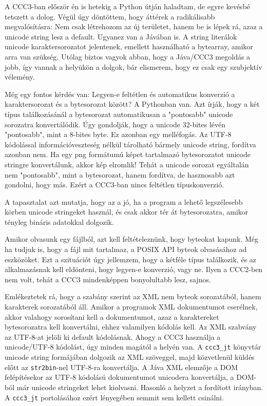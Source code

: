 A CCC3-ban először én is hetekig a Python útján haladtam,
de egyre kevésbé tetszett a dolog. Végül úgy döntöttem,
hogy áttérek a radikálisabb megvalósításra: Nem csak létrehozom
az új területet, hanem be is lépek rá, azaz a unicode string
lesz a default. Ugyanez van a Jávában is. A string literálok
unicode karaktersorozatot jelentenek, emellett használható a
bytearray, amikor arra van szükség. Utólag biztos vagyok
abban, hogy a Jáva/CCC3 megoldás a jobb, így vannak a helyükön
a dolgok, bár elismerem, hogy ez csak egy szubjektív vélemény.

Még egy fontos kérdés van: Legyen-e feltétlen és automatikus
konverzió a karaktersorozat és a bytesorozat között?
A Pythonban van. Azt írják, hogy a két típus találkozásánál
a bytesorozat automatikusan a "pontosabb" unicode sorozatra
konvertálódik. Úgy gondolják, hogy a unicode 32-bites lévén
"pontosabb", mint a 8-bites byte. Ez azonban egy melléfogás.
Az UTF-8 kódolással információveszteség nélkül tárolható
bármely unicode string, fordítva azonban nem.
Ha egy png formátumú képet tartalmazó bytesorozatot
unicode stringre konvertálunk, akkor kép elromlik!
Tehát a unicode sorozat egyáltalán nem "pontosabb", 
mint a bytesorozat, hanem fordítva, de hasznosabb azt gondolni, 
hogy más. Ezért a CCC3-ban nincs feltétlen típuskonverzió.

A tapasztalat azt mutatja, hogy az a jó, ha a program 
a lehető legszélesebb körben unicode stringeket használ,
és csak akkor tér át bytesorozatra, amikor tényleg
bináris adatokkal dolgozik. 

Amikor olvasunk egy fájlból, azt kell feltételeznünk, hogy
byteokat kapunk. Még ha tudjuk is, hogy a fájl mit tartalmaz,
a POSIX API byteok olvasásához ad eszközöket. 
Ezt a szituációt úgy jellemzem, hogy a kétféle típus találkozik,
és az alkalmazásnak kell eldönteni, hogy legyen-e konverzió,
vagy ne. Ilyen a CCC2-ben nem volt, tehát a CCC3 mindenképpen
bonyolultabb lesz, sajnos.

Emlékeztetek rá, hogy a szabány szerint az XML nem byteok
sorozatából, hanem karakterek sorozatából áll. Amikor a programok
XML dokumentumot cserélnek, akkor valahogy sorosítani kell
a dokumentumot, azaz a karaktereket bytesorozatra kell
konvertálni, ehhez valamilyen kódolás kell. Az XML szabvány 
az UTF-8-at jelöli ki default kódolásnak. Ahogy a CCC3 használja 
a unicode/UTF-8 kódolást, úgy minden magától a helyén van. 
A \verb!ccc3_jt! könyvtár unicode string formájában dolgozik az XML 
szöveggel, majd közvetlenül küldés előtt az \verb!str2bin!-nel 
UTF-8-ra konvertálja. A Jáva XML elemzője a DOM felépítésekor
az UTF-8 kódolású dokumentumot unicodera konvertálja, 
a DOM-ból már unicode stringeket lehet kiolvasni.
Hasonló a helyzet a fordított irányban.
A \verb!ccc3_jt! portolásához ezért lényegében semmit sem 
kellett csinálni.

